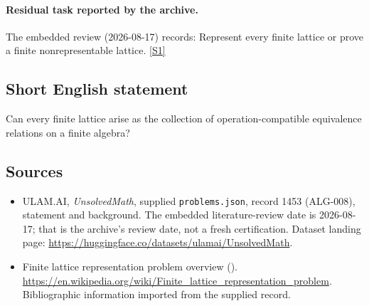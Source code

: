 \documentclass[11pt,a4paper]{article}
\newcommand{\sref}[2]{\hyperlink{source:#1:#2}{[S#2]}}
\begin{document}
\paragraph{Residual task reported by the archive.}

The embedded review (2026-08-17) records: Represent every finite lattice or prove a finite nonrepresentable lattice. \sref{1453}{1}

\subsection{Short English statement}

Can every finite lattice arise as the collection of operation-compatible equivalence relations on a finite algebra?

\subsection{Sources}

{\small

\begin{itemize}

\item[\hypertarget{source:1453:1}{S1}] ULAM.AI, \emph{UnsolvedMath}, supplied \texttt{problems.json}, record 1453 (ALG-008), statement and background. The embedded literature-review date is 2026-08-17; that is the archive’s review date, not a fresh certification. Dataset landing page: \url{https://huggingface.co/datasets/ulamai/UnsolvedMath}.

\item[\hypertarget{source:1453:2}{S2}] Finite lattice representation problem overview (). \url{https://en.wikipedia.org/wiki/Finite_lattice_representation_problem}. Bibliographic information imported from the supplied record.

\end{itemize}

}

\label{end:1453}
\end{document}
